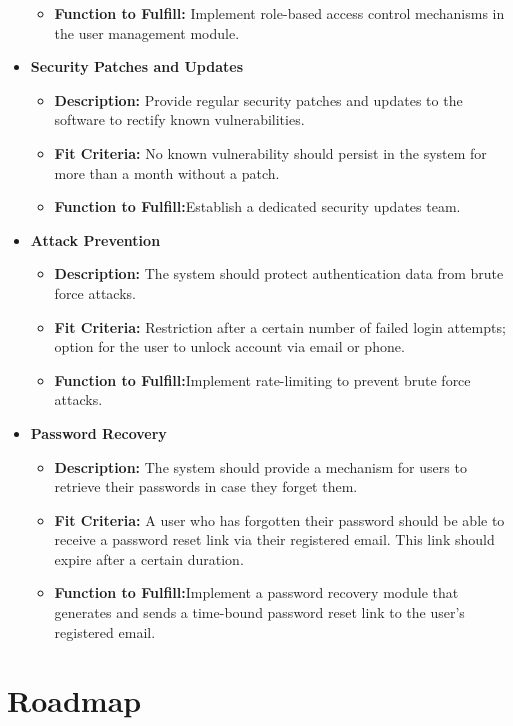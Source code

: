 \documentclass{article}
\newcounter{srnum} %
\newcommand{\rthesrnum}{SR\refstepcounter{srnum}\thesrnum:}
\begin{document}
\begin{itemize}[leftmargin=16.5mm,labelsep=4mm,label=\rthesrnum]
\begin{itemize}
  \item \textbf{Function to Fulfill:} Implement role-based access control mechanisms in the user management module.
  \end{itemize}
\item \textbf{Security Patches and Updates}
  \begin{itemize}
  \item \textbf{Description:} Provide regular security patches and updates to the software to rectify known vulnerabilities.
  \item \textbf{Fit Criteria:} No known vulnerability should persist in the system for more than a month without a patch.
  \item \textbf{Function to Fulfill:}Establish a dedicated security updates team.
  \end{itemize}
\item \textbf{Attack Prevention}
  \begin{itemize}
  \item \textbf{Description:} The system should protect authentication data from brute force attacks.
  \item \textbf{Fit Criteria:} Restriction after a certain number of failed login attempts; option for the user to unlock account via email or phone.
  \item \textbf{Function to Fulfill:}Implement rate-limiting to prevent brute force attacks.
  \end{itemize}
\item \textbf{Password Recovery}
  \begin{itemize}
  \item \textbf{Description:} The system should provide a mechanism for users to retrieve their passwords in case they forget them.
  \item \textbf{Fit Criteria:} A user who has forgotten their password should be able to receive a password reset link via their registered email. This link should expire after a certain duration.
  \item \textbf{Function to Fulfill:}Implement a password recovery module that generates and sends a time-bound password reset link to the user's registered email.
  \end{itemize}
\end{itemize}

\section{Roadmap}
\end{document}
